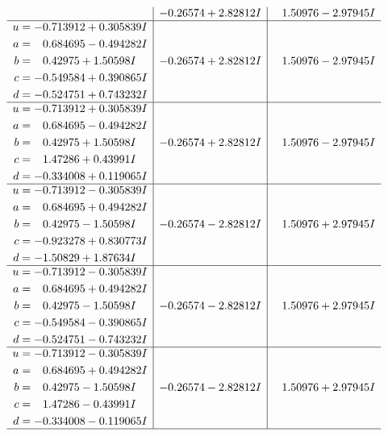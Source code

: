 \documentclass[1p]{elsarticle_modified}
\theoremstyle{definition}
\begin{document}
$$\begin{array}{c|c|c}
 & -0.26574 + 2.82812 I & \phantom{-}1.50976 - 2.97945 I \\ \hline\begin{aligned}
u &= -0.713912 + 0.305839 I \\
a &= \phantom{-}0.684695 - 0.494282 I \\
b &= \phantom{-}0.42975 + 1.50598 I \\
c &= -0.549584 + 0.390865 I \\
d &= -0.524751 + 0.743232 I\end{aligned}
 & -0.26574 + 2.82812 I & \phantom{-}1.50976 - 2.97945 I \\ \hline\begin{aligned}
u &= -0.713912 + 0.305839 I \\
a &= \phantom{-}0.684695 - 0.494282 I \\
b &= \phantom{-}0.42975 + 1.50598 I \\
c &= \phantom{-}1.47286 + 0.43991 I \\
d &= -0.334008 + 0.119065 I\end{aligned}
 & -0.26574 + 2.82812 I & \phantom{-}1.50976 - 2.97945 I \\ \hline\begin{aligned}
u &= -0.713912 - 0.305839 I \\
a &= \phantom{-}0.684695 + 0.494282 I \\
b &= \phantom{-}0.42975 - 1.50598 I \\
c &= -0.923278 + 0.830773 I \\
d &= -1.50829 + 1.87634 I\end{aligned}
 & -0.26574 - 2.82812 I & \phantom{-}1.50976 + 2.97945 I \\ \hline\begin{aligned}
u &= -0.713912 - 0.305839 I \\
a &= \phantom{-}0.684695 + 0.494282 I \\
b &= \phantom{-}0.42975 - 1.50598 I \\
c &= -0.549584 - 0.390865 I \\
d &= -0.524751 - 0.743232 I\end{aligned}
 & -0.26574 - 2.82812 I & \phantom{-}1.50976 + 2.97945 I \\ \hline\begin{aligned}
u &= -0.713912 - 0.305839 I \\
a &= \phantom{-}0.684695 + 0.494282 I \\
b &= \phantom{-}0.42975 - 1.50598 I \\
c &= \phantom{-}1.47286 - 0.43991 I \\
d &= -0.334008 - 0.119065 I\end{aligned}
 & -0.26574 - 2.82812 I & \phantom{-}1.50976 + 2.97945 I\\
 \hline 
 \end{array}$$\newpage\newpage\renewcommand{\arraystretch}{1}
\end{document}
